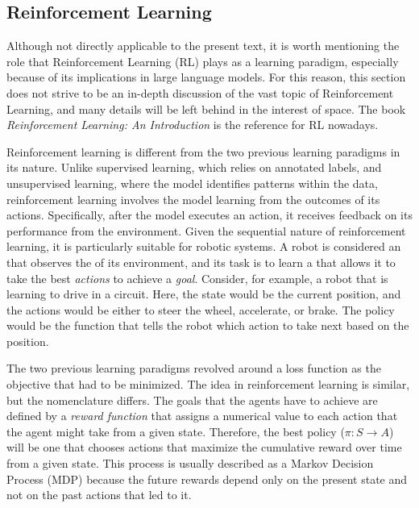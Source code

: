 \subsection{Reinforcement Learning}
Although not directly applicable to the present text, it is worth mentioning the role that Reinforcement Learning (RL) plays as a learning paradigm, especially because of its implications in large language models. For this reason, this section does not strive to be an in-depth discussion of the vast topic of Reinforcement Learning, and many details will be left behind in the interest of space. The book \textit{Reinforcement Learning: An Introduction} is the reference for RL nowadays.

Reinforcement learning is different from the two previous learning paradigms in its nature. Unlike supervised learning, which relies on annotated labels, and unsupervised learning, where the model identifies patterns within the data, reinforcement learning involves the model learning from the outcomes of its actions. Specifically, after the model executes an action, it receives feedback on its performance from the environment. Given the sequential nature of reinforcement learning, it is particularly suitable for robotic systems. A robot is considered an \textit{} that observes the \textit{} of its environment, and its task is to learn a \textit{} that allows it to take the best \textit{actions} to achieve a \textit{goal}. Consider, for example, a robot that is learning to drive in a circuit. Here, the state would be the current position, and the actions would be either to steer the wheel, accelerate, or brake. The policy would be the function that tells the robot which action to take next based on the position.

The two previous learning paradigms revolved around a loss function as the objective that had to be minimized. The idea in reinforcement learning is similar, but the nomenclature differs. The goals that the agents have to achieve are defined by a \textit{reward function} that assigns a numerical value to each action that the agent might take from a given state. Therefore, the best policy ($\pi: S \rightarrow A$) will be one that chooses actions that maximize the cumulative reward over time from a given state. This process is usually described as a Markov Decision Process (MDP) because the future rewards depend only on the present state and not on the past actions that led to it.

